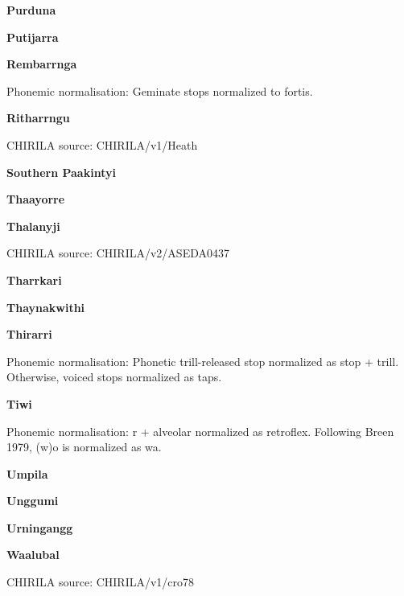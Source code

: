 \textbf{Purduna}


\textbf{Putijarra}


\textbf{Rembarrnga}


Phonemic normalisation: Geminate stops normalized to fortis.

\textbf{Ritharrngu}

CHIRILA source: CHIRILA/v1/Heath


\textbf{Southern Paakintyi}


\textbf{Thaayorre}


\textbf{Thalanyji}

CHIRILA source: CHIRILA/v2/ASEDA0437


\textbf{Tharrkari}


\textbf{Thaynakwithi}


\textbf{Thirarri}


Phonemic normalisation: Phonetic trill-released stop normalized as stop
+ trill. Otherwise, voiced stops normalized as taps.

\textbf{Tiwi}


Phonemic normalisation: r + alveolar normalized as retroflex. Following
Breen 1979, (w)o is normalized as wa.

\textbf{Umpila}


\textbf{Unggumi}


\textbf{Urningangg}


\textbf{Waalubal}

CHIRILA source: CHIRILA/v1/cro78


